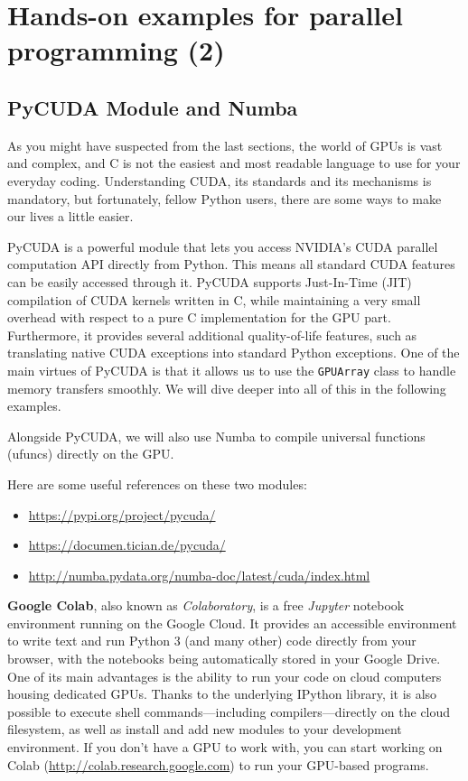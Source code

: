 \section{Hands-on examples for parallel programming (2)}\label{sec:hands_on_cuda_2}

\subsection{PyCUDA Module and Numba}
As you might have suspected from the last sections, the world of GPUs is vast and complex, and C is not the easiest and most readable language to use for your everyday coding. Understanding CUDA, its standards and its mechanisms is mandatory, but fortunately, fellow Python users, there are some ways to make our lives a little easier. 

PyCUDA is a powerful module that lets you access NVIDIA's CUDA parallel computation API directly from Python. This means all standard CUDA features can be easily accessed through it. PyCUDA supports Just-In-Time (JIT) compilation of CUDA kernels written in C, while maintaining a very small overhead with respect to a pure C implementation for the GPU part.  Furthermore, it provides several additional quality-of-life features, such as translating native CUDA exceptions into standard Python exceptions. One of the main virtues of PyCUDA is that it allows us to use the \texttt{GPUArray} class to handle memory transfers smoothly. We will dive deeper into all of this in the following examples.

Alongside PyCUDA, we will also use Numba to compile universal functions (ufuncs) directly on the GPU.

Here are some useful references on these two modules:
\begin{itemize}
    \item[-] \url{https://pypi.org/project/pycuda/}
    \item[-] \url{https://documen.tician.de/pycuda/}
    \item[-] \url{http://numba.pydata.org/numba-doc/latest/cuda/index.html}
\end{itemize}

\textbf{Google Colab}, also known as \textit{Colaboratory}, is a free \textit{Jupyter} notebook environment running on the Google Cloud. It provides an accessible environment to write text and run Python 3 (and many other) code directly from your browser, with the notebooks being automatically stored in your Google Drive. One of its main advantages is the ability to run your code on cloud computers housing dedicated GPUs. Thanks to the underlying IPython library, it is also possible to execute shell commands---including compilers---directly on the cloud filesystem, as well as install and add new modules to your development environment. If you don't have a GPU to work with, you can start working on Colab (\url{http://colab.research.google.com}) to run your GPU-based programs.

